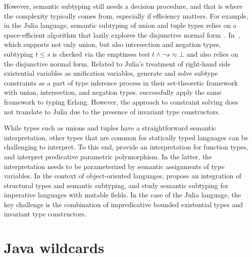 However, semantic subtyping still needs a decision procedure, and that is where
the complexity typically comes from, especially if efficiency matters.
For example, in the Julia language, semantic subtyping of union and tuple types
relies on a space-efficient algorithm that lazily explores the disjunctive
normal form~\cite{chung:julia-sub-algo:2019}.
In~\cite{frisch:sem-sub:2002}, which supports not only union, but also
intersection and negation types, subtyping $t \leq s$ is checked via
the emptiness test $t \land \lnot s \approx \bot$ and also relies on
the disjunctive normal form.
Related to Julia's treatment of right-hand side existential variables as 
unification variables, \citet{castagna:sem-poly-inf:2015} generate and solve
subtype constraints as a part of type inference process in their set-theoretic
framework with union, intersection, and negation types.
\citet{schimpf:set-types-erlang:2023} successfully apply the
same framework to typing Erlang.
However, the approach to constraint solving does not translate to Julia
due to the presence of invariant type constructors.%

While types such as unions and tuples have a straightforward
semantic interpretation, other types that are common for statically typed
languages can be challenging to interpret.
To this end, \citet{frisch:sem-sub:2002} provide an interpretation for
function types, and \citet{castagna:sem-poly:2011} interpret predicative
parametric polymorphism. In the latter, the interpretation needs to be
parameterized by semantic assignments of type variables.
In the context of object-oriented languages,
\citet{dardha:sem-sub-obj:2016} propose an integration of structural types and
semantic subtyping, and \citet{ancona:sem-sub-imp:2016} study semantic
subtyping for imperative languages with mutable fields.
In the case of the Julia language, %
the key challenge is the combination of
impredicative bounded existential types and invariant type constructors.

\section{Java wildcards}

